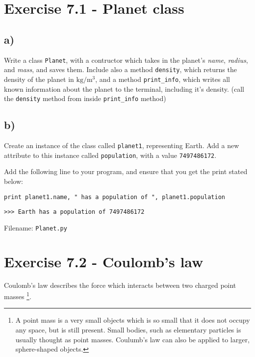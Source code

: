 \documentclass[10pt,a4paper]{article}
\begin{document}
\section*{Exercise 7.1 - Planet class}

\subsection*{a)}
Write a class \texttt{Planet}, with a contructor which takes in the planet's \textit{name}, \textit{radius}, and \textit{mass}, and saves them. Include also a method \texttt{density}, which returns the density of the planet in $\mathrm{kg/m^3}$, and a method \texttt{print\_info}, which writes all known information about the planet to the terminal, including it's density. (call the \texttt{density} method from inside \texttt{print\_info} method)

\subsection*{b)}
Create an instance of the class called \texttt{planet1}, representing Earth. Add a new attribute to this instance called \texttt{population}, with a value \texttt{7497486172}.

Add the following line to your program, and ensure that you get the print stated below:

\texttt{print planet1.name, " has a population of ", planet1.population}
\begin{lstlisting}
>>> Earth has a population of 7497486172
\end{lstlisting}

Filename: \texttt{Planet.py}



\section*{Exercise 7.2 - Coulomb's law}

Coulomb's law describes the force which interacts between two charged point masses \footnote{A point mass is a very small objects which is so small that it does not occupy any space, but is still present. Small bodies, such as elementary particles is usually thought as point masses. Coulumb's law can also be applied to larger, sphere-shaped objects.}.
\end{document}
